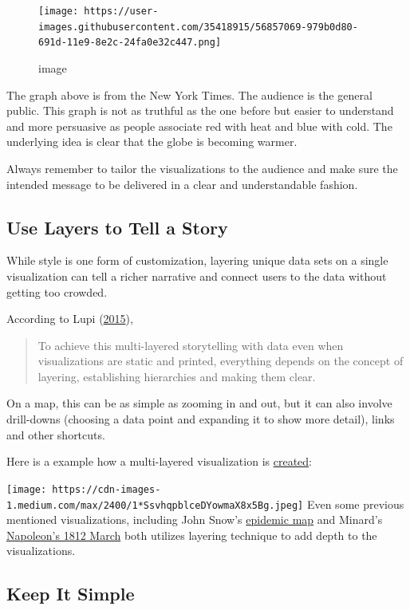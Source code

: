 \documentclass[]{book}
\begin{document}
\begin{figure}
\centering
\texttt{[image: https://user-images.githubusercontent.com/35418915/56857069-979b0d80-691d-11e9-8e2c-24fa0e32c447.png]}
\caption{image}
\end{figure}

The graph above is from the New York Times. The audience is the general public. This graph is not as truthful as the one before but easier to understand and more persuasive as people associate red with heat and blue with cold. The underlying idea is clear that the globe is becoming warmer.

Always remember to tailor the visualizations to the audience and make sure the intended message to be delivered in a clear and understandable fashion.

\hypertarget{use-layers-to-tell-a-story}{%
\subsection{Use Layers to Tell a Story}\label{use-layers-to-tell-a-story}}

While style is one form of customization, layering unique data sets on a single visualization can tell a richer narrative and connect users to the data without getting too crowded.

According to Lupi (\protect\hyperlink{ref-Lupi}{2015}),

\begin{quote}
To achieve this multi-layered storytelling with data even when visualizations are static and printed, everything depends on the concept of layering, establishing hierarchies and making them clear.
\end{quote}

On a map, this can be as simple as zooming in and out, but it can also involve drill-downs (choosing a data point and expanding it to show more detail), links and other shortcuts.

Here is a example how a multi-layered visualization is
\href{https://medium.com/accurat-studio/the-architecture-of-a-data-visualization-470b807799b4}{created}:

\texttt{[image: https://cdn-images-1.medium.com/max/2400/1*SsvhqpblceDYowmaX8x5Bg.jpeg]}
Even some previous mentioned visualizations, including John Snow's \href{images/Snow.png}{epidemic map} and Minard's \href{images/Minard.png}{Napoleon's 1812 March} both utilizes layering technique to add depth to the visualizations.

\hypertarget{keep-it-simple}{%
\subsection{Keep It Simple}\label{keep-it-simple}}
\end{document}
